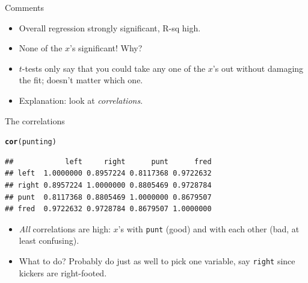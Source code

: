 \documentclass[unknownkeysallowed]{beamer}\usepackage[]{graphicx}\usepackage[]{color}
\makeatletter
\newcommand{\hlstd}[1]{\textcolor[rgb]{0.345,0.345,0.345}{#1}}%
\newcommand{\hlkwd}[1]{\textcolor[rgb]{0.737,0.353,0.396}{\textbf{#1}}}%
\newenvironment{kframe}{%
 \def\at@end@of@kframe{}%
 \ifinner\ifhmode%
  \def\at@end@of@kframe{\end{minipage}}%
  \begin{minipage}{\columnwidth}%
 \fi\fi%
 \def\FrameCommand##1{\hskip\@totalleftmargin \hskip-\fboxsep
 \colorbox{shadecolor}{##1}\hskip-\fboxsep
     \hskip-\linewidth \hskip-\@totalleftmargin \hskip\columnwidth}%
 \MakeFramed {\advance\hsize-\width
   \@totalleftmargin\z@ \linewidth\hsize
   \@setminipage}}%
 {\par\unskip\endMakeFramed%
 \at@end@of@kframe}
\newenvironment{knitrout}{}{} %
\makeatother
\begin{document}
\begin{frame}{Comments}

  \begin{itemize}
  \item Overall regression strongly significant, R-sq high.
  \item None of the $x$'s significant! Why?
  \item $t$-tests only say that you could take any one of the $x$'s out without damaging the fit; doesn't matter which one.
  \item Explanation: look at {\em correlations}. 
  \end{itemize}
\end{frame}

\begin{frame}[fragile]{The correlations}  

 
\begin{knitrout}
\color{fgcolor}\begin{kframe}
\begin{alltt}
\hlkwd{cor}\hlstd{(punting)}
\end{alltt}
\begin{verbatim}
##            left     right      punt      fred
## left  1.0000000 0.8957224 0.8117368 0.9722632
## right 0.8957224 1.0000000 0.8805469 0.9728784
## punt  0.8117368 0.8805469 1.0000000 0.8679507
## fred  0.9722632 0.9728784 0.8679507 1.0000000
\end{verbatim}
\end{kframe}
\end{knitrout}
  

\begin{itemize}
\item {\em All} correlations are high: $x$'s with \verb-punt- (good) and
with each other (bad, at least confusing).
\item What to do? Probably do just as well to pick one variable, say
\texttt{right} since kickers are right-footed.
\end{itemize}



\end{frame}
\end{document}
